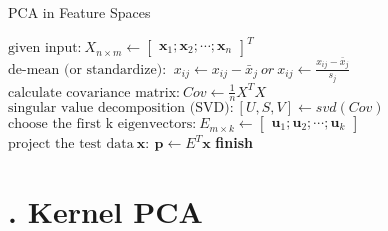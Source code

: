 \begin{algorithm}
\caption{PCA in Feature Spaces}
\label{PCA}
\begin{algorithmic}[1]
	\State $\text{given input:} \  X_{n \times m} \leftarrow \begin{bmatrix} \mathbf{x}_1; \mathbf{x}_2; \cdots; \mathbf{x}_n \end{bmatrix}^T$
	\State $\text{de-mean (or standardize): } \  x_{ij} \leftarrow x_{ij} - \bar{x}_j \  or \  x_{ij} \leftarrow \frac{x_{ij} - \bar{x}_j}{s_j}$
	\State $\text{calculate covariance matrix:} \  Cov \leftarrow \frac{1}{n} X^T X$
	\State $\text{singular value decomposition (SVD):} \  [U, S, V] \leftarrow svd(Cov)$
	\State $\text{choose the first k eigenvectors:} \  E_{m \times k} \leftarrow \begin{bmatrix} \mathbf{u}_1; \mathbf{u}_2; \cdots; \mathbf{u}_k \end{bmatrix}$
	\State $\text{project the test data} \  \mathbf{x}: \  \mathbf{p} \leftarrow E^T \mathbf{x}$
\BState \bf finish
\EndProcedure
\end{algorithmic}
\end{algorithm}



\section*{\Large {}. Kernel PCA}

